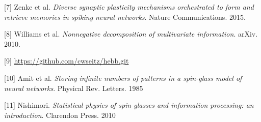 \documentclass{article} %
\begin{document}
[7] Zenke et al. \textit{Diverse synaptic plasticity mechanisms
orchestrated to form and retrieve memories
in spiking neural networks}. Nature Communications. 2015.

[8] Williams et al. \textit{Nonnegative decomposition of multivariate information}. arXiv. 2010.

[9] \url{https://github.com/cwseitz/hebb.git}

[10] Amit et al. \textit{Storing infinite numbers of patterns in a spin-glass model of neural networks}. Physical Rev. Letters. 1985

[11] Nishimori. \textit{Statistical physics of spin glasses and information processing: an introduction}. Clarendon Press. 2010
\end{document}
